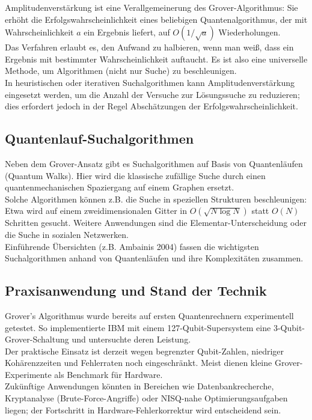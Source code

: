 Amplitudenverstärkung ist eine Verallgemeinerung des Grover-Algorithmus: Sie erhöht die Erfolgswahrscheinlichkeit eines beliebigen Quantenalgorithmus, der mit Wahrscheinlichkeit $a$ ein Ergebnis liefert, auf $O(1/\sqrt{a})$ Wiederholungen.\\
Das Verfahren erlaubt es, den Aufwand zu halbieren, wenn man weiß, dass ein Ergebnis mit bestimmter Wahrscheinlichkeit auftaucht. Es ist also eine universelle Methode, um Algorithmen (nicht nur Suche) zu beschleunigen.\\
In heuristischen oder iterativen Suchalgorithmen kann Amplitudenverstärkung eingesetzt werden, um die Anzahl der Versuche zur Lösungssuche zu reduzieren; dies erfordert jedoch in der Regel Abschätzungen der Erfolgswahrscheinlichkeit.

\subsection{Quantenlauf-Suchalgorithmen}

Neben dem Grover-Ansatz gibt es Suchalgorithmen auf Basis von Quantenläufen (Quantum Walks). Hier wird die klassische zufällige Suche durch einen quantenmechanischen Spaziergang auf einem Graphen ersetzt.\\
Solche Algorithmen können z.B. die Suche in speziellen Strukturen beschleunigen: Etwa wird auf einem zweidimensionalen Gitter in $O(\sqrt{N\log N})$ statt $O(N)$ Schritten gesucht. Weitere Anwendungen sind die Elementar-Unterscheidung oder die Suche in sozialen Netzwerken.\\
Einführende Übersichten (z.B. Ambainis 2004) fassen die wichtigsten Suchalgorithmen anhand von Quantenläufen und ihre Komplexitäten zusammen.

\subsection{Praxisanwendung und Stand der Technik}

Grover’s Algorithmus wurde bereits auf ersten Quantenrechnern experimentell getestet. So implementierte IBM mit einem 127-Qubit-Supersystem eine 3-Qubit-Grover-Schaltung und untersuchte deren Leistung.\\
Der praktische Einsatz ist derzeit wegen begrenzter Qubit-Zahlen, niedriger Kohärenzzeiten und Fehlerraten noch eingeschränkt. Meist dienen kleine Grover-Experimente als Benchmark für Hardware.\\
Zukünftige Anwendungen könnten in Bereichen wie Datenbankrecherche, Kryptanalyse (Brute-Force-Angriffe) oder NISQ-nahe Optimierungsaufgaben liegen; der Fortschritt in Hardware-Fehlerkorrektur wird entscheidend sein.

